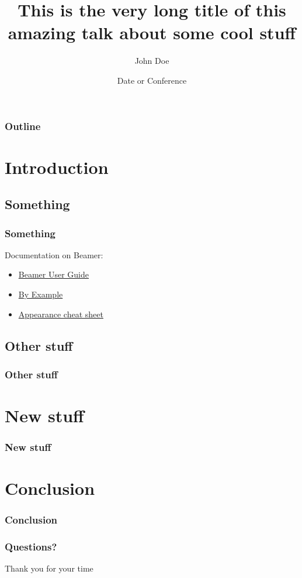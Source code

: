 \documentclass[xcolor=pdftex,dvipsnames,table]{beamer}
\title[Short title of talk]{This is the very long title of this amazing talk about some cool stuff}
\author[J Doe]{John Doe}
\institute[UoW]{University of Waikato, Hamilton, NZ}
\date[Date or Conf]{Date or Conference}
\begin{document}


{
\begin{frame}
  \titlepage
\end{frame}
}
\addtocounter{framenumber}{-1}


\begin{frame}
  \frametitle{Outline}
  \tableofcontents
\end{frame}


\section{Introduction}
\subsection{Something}

\begin{frame}
  \frametitle{Something}
  Documentation on Beamer:
  \begin{itemize}
    \item \href{http://mirror.ctan.org/macros/latex/contrib/beamer/doc/beameruserguide.pdf}{Beamer User Guide}
    \item \href{http://www.tug.org/pracjourn/2005-4/mertz/mertz.pdf}{By Example}
    \item \href{http://www.cpt.univ-mrs.fr/~masson/latex/Beamer-appearance-cheat-sheet.pdf}{Appearance cheat sheet}
  \end{itemize}
\end{frame}

\subsection{Other stuff}
\begin{frame}
  \frametitle{Other stuff}
\end{frame}

\section{New stuff}

\begin{frame}
 \frametitle{New stuff}
\end{frame}

\section{Conclusion}

\begin{frame}
 \frametitle{Conclusion}
\end{frame}


\begin{frame}
 \frametitle{Questions?}
 \begin{center}
   Thank you for your time
 \end{center}
\end{frame}
\end{document}
